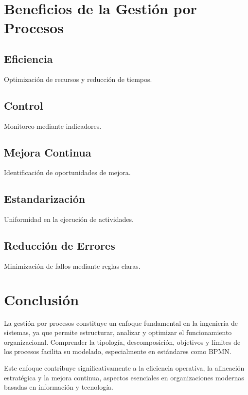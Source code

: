 \documentclass[12pt,a4paper]{article}
\begin{document}
\section{Beneficios de la Gestión por Procesos}

\subsection{Eficiencia}
Optimización de recursos y reducción de tiempos.

\subsection{Control}
Monitoreo mediante indicadores.

\subsection{Mejora Continua}
Identificación de oportunidades de mejora.

\subsection{Estandarización}
Uniformidad en la ejecución de actividades.

\subsection{Reducción de Errores}
Minimización de fallos mediante reglas claras.

\section{Conclusión}

La gestión por procesos constituye un enfoque fundamental en la ingeniería de sistemas, ya que permite estructurar, analizar y optimizar el funcionamiento organizacional. Comprender la tipología, descomposición, objetivos y límites de los procesos facilita su modelado, especialmente en estándares como BPMN.

Este enfoque contribuye significativamente a la eficiencia operativa, la alineación estratégica y la mejora continua, aspectos esenciales en organizaciones modernas basadas en información y tecnología.
\end{document}

